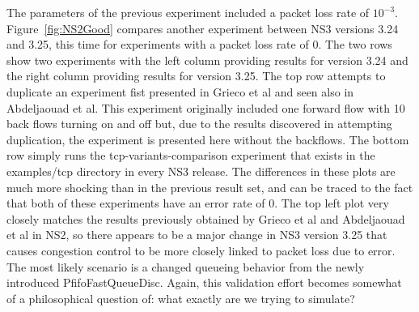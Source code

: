 \documentclass[conference]{IEEEtran}
\begin{document}
The parameters of the previous experiment included a packet loss rate of $10^{-3}$. Figure~\ref{fig:NS2Good} compares another experiment between NS3 versions 3.24 and 3.25, this time for experiments with a packet loss rate of 0. The two rows show two experiments with the left column providing results for version 3.24 and the right column providing results for version 3.25. The top row attempts to duplicate an experiment fist presented in Grieco et al\cite{NS2WP} and seen also in Abdeljaouad et al\cite{NS2Val}. This experiment originally included one forward flow with 10 back flows turning on and off but, due to the results discovered in attempting duplication, the experiment is presented here without the backflows. The bottom row simply runs the tcp-variants-comparison experiment that exists in the examples/tcp directory in every NS3 release. The differences in these plots are much more shocking than in the previous result set, and can be traced to the fact that both of these experiments have an error rate of 0. The top left plot very closely matches the results previously obtained by Grieco et al\cite{NS2WP} and Abdeljaouad et al\cite{NS2Val} in NS2, so there appears to be a major change in NS3 version 3.25 that causes congestion control to be more closely linked to packet loss due to error. The most likely scenario is a changed queueing behavior from the newly introduced PfifoFastQueueDisc. Again, this validation effort becomes somewhat of a philosophical question of: what exactly are we trying to simulate? 
\end{document}
